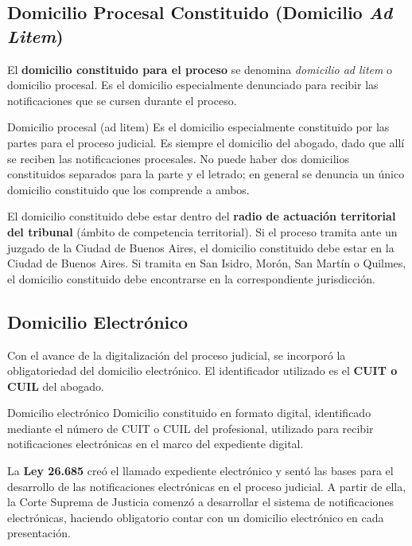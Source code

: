 \documentclass[12pt,oneside]{book}
\begin{document}
\subsection{Domicilio Procesal Constituido (Domicilio \textit{Ad Litem})}

El \textbf{domicilio constituido para el proceso} se denomina \textit{domicilio ad litem} o domicilio procesal. Es el domicilio especialmente denunciado para recibir las notificaciones que se cursen durante el proceso.

\begin{definition}{Domicilio procesal (ad litem)}
Es el domicilio especialmente constituido por las partes para el proceso judicial. Es siempre el domicilio del abogado, dado que allí se reciben las notificaciones procesales. No puede haber dos domicilios constituidos separados para la parte y el letrado; en general se denuncia un único domicilio constituido que los comprende a ambos.
\end{definition}

\begin{important}
El domicilio constituido debe estar dentro del \textbf{radio de actuación territorial del tribunal} (ámbito de competencia territorial). Si el proceso tramita ante un juzgado de la Ciudad de Buenos Aires, el domicilio constituido debe estar en la Ciudad de Buenos Aires. Si tramita en San Isidro, Morón, San Martín o Quilmes, el domicilio constituido debe encontrarse en la correspondiente jurisdicción.
\end{important}

\subsection{Domicilio Electrónico}

Con el avance de la digitalización del proceso judicial, se incorporó la obligatoriedad del domicilio electrónico. El identificador utilizado es el \textbf{CUIT o CUIL} del abogado.

\begin{definition}{Domicilio electrónico}
Domicilio constituido en formato digital, identificado mediante el número de CUIT o CUIL del profesional, utilizado para recibir notificaciones electrónicas en el marco del expediente digital.
\end{definition}

\begin{important}
La \textbf{Ley 26.685} creó el llamado expediente electrónico y sentó las bases para el desarrollo de las notificaciones electrónicas en el proceso judicial. A partir de ella, la Corte Suprema de Justicia comenzó a desarrollar el sistema de notificaciones electrónicas, haciendo obligatorio contar con un domicilio electrónico en cada presentación.
\end{important}
\end{document}
